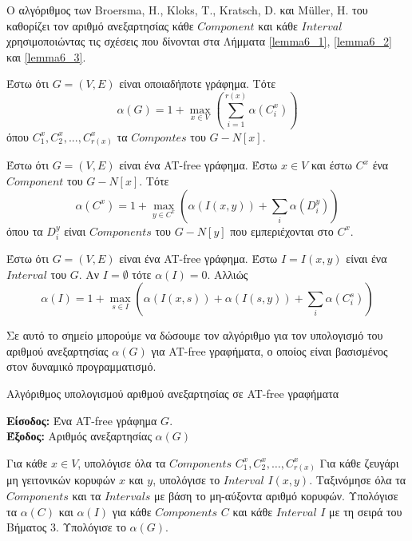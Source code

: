  Ο αλγόριθμος των Broersma, H., Kloks, T., Kratsch, D. και Müller, H. του καθορίζει τον αριθμό ανεξαρτησίας κάθε $Component$ και κάθε $Interval$ χρησιμοποιώντας τις σχέσεις που δίνονται στα Λήμματα \ref{lemma6_1}, \ref{lemma6_2} και \ref{lemma6_3}.
 
 \begin{lemma}
 	\label{lemma6_1}
 	Έστω ότι $G = (V,E)$ είναι οποιαδήποτε γράφημα. 
 	Τότε $$\alpha(G)=1+\max_{x\in V}\left(\sum_{i=1}^{r(x)}\alpha(C_i^x)\right)$$ όπου  $C_1^x, C_2^x,...,C_{r(x)}^x$ τα $Compontes$ του $G - N[x]$.
 \end{lemma}

\begin{lemma}
	\label{lemma6_2}
		Έστω ότι $G = (V,E)$ είναι ένα AT-free γράφημα. Έστω $x \in V$ και έστω $C^x$ ένα $Component$ του $G - N[x]$. Τότε $$\alpha(C^x)=1+\max_{y\in C^x}\left(\alpha(I(x,y))+\sum_{i}\alpha(D_i^y)\right)$$ όπου τα $D_i^y$ είναι $Components$ του $G - N[y]$ που εμπεριέχονται στο $C^x$. 
\end{lemma}

\begin{lemma}
	\label{lemma6_3}
	Έστω ότι $G = (V,E)$ είναι ένα AT-free γράφημα. Έστω $I = I(x,y)$ είναι ένα $Interval$ του $G$. Αν $I = \emptyset$ τότε $\alpha(I) = 0$. Αλλιώς $$\alpha(I)=1+\max_{s\in I}\left(\alpha(I(x,s))+\alpha(I(s,y))+\sum_{i}\alpha(C_i^s)\right)$$
\end{lemma}
	
Σε αυτό το σημείο μπορούμε να δώσουμε τον αλγόριθμο για τον υπολογισμό του αριθμού ανεξαρτησίας $\alpha(G)$ για AT-free γραφήματα, ο οποίος είναι βασισμένος στον δυναμικό προγραμματισμό. 

\begin{algorithm}[H]
	\caption{Αλγόριθμος υπολογισμού αριθμού ανεξαρτησίας σε AT-free γραφήματα}
	\label{alg:DOPC}
	
	\hspace*{\algorithmicindent} \textbf{Είσοδος:} Ένα AT-free γράφημα $G$.\\
	 
	\hspace*{\algorithmicindent} \textbf{Έξοδος:} Αριθμός ανεξαρτησίας $\alpha(G)$
	
	\begin{algorithmic}[1]
		
		\STATE Για κάθε $x \in V$, υπολόγισε όλα τα $Components$ $C_1^x , C_2^x , \ldots , C_{r(x)}^x$
		\STATE Για κάθε ζευγάρι μη γειτονικών κορυφών $x$ και $y$, υπολόγισε το $Interval$ $I(x, y)$.
		\STATE Ταξινόμησε όλα τα $Components$ και τα $Intervals$ με βάση το μη-αύξοντα αριθμό κορυφών.
		\STATE Υπολόγισε τα $\alpha(C)$ και $\alpha(I)$ για κάθε $Components$ $C$ και κάθε $Interval$ $I$ με τη σειρά του Βήματος 3.
		\STATE Υπολόγισε το $\alpha(G)$.
				
	\end{algorithmic}
\end{algorithm}

